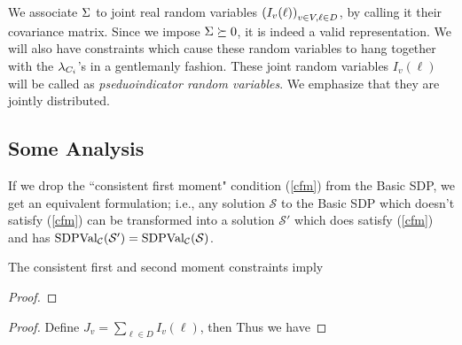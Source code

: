We associate $\Sigma$ to joint real random variables $\left(I_v(\ell)\right)_{v\in V, \ell \in D}$, by calling it their covariance matrix. Since we impose $\Sigma \succeq 0$, it is indeed a valid representation. 
We will also have constraints which cause these random variables to hang together with the $\lambda_{C_i}$'s in a gentlemanly fashion. 
These joint random variables $I_v(\ell)$ will be called as \textit{pseduoindicator random variables}. 
We emphasize that they are jointly distributed. 


\subsection{Some Analysis}
\begin{remark}\label{remark01}
If we drop the ``consistent first moment" condition (\ref{cfm}) from the Basic SDP, we get
an equivalent formulation; i.e., any solution $\mathcal{S}$ to the Basic SDP which doesn't satisfy  (\ref{cfm}) can be transformed into a solution $\mathcal{S}'$ which does satisfy  (\ref{cfm}) and has $\mbox{SDPVal}_{\mathcal{C}}(\mathcal{S}')
= \mbox{SDPVal}_{\mathcal{C}} (\mathcal{S})$.
\end{remark}

\begin{remark}
The consistent first and second moment constraints imply 
\end{remark}
\begin{proof}
\end{proof}
\begin{remark}
\end{remark}
\begin{proof}
Define $J_v = \sum_{\ell \in D} I_v(\ell)$, then 
Thus we have 
\end{proof}

